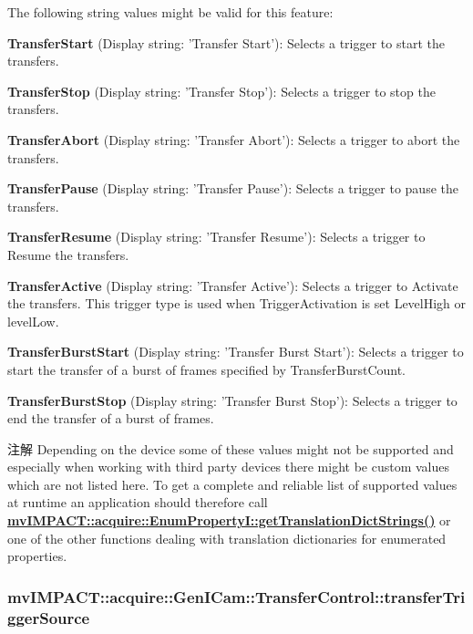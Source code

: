 The following string values might be valid for this feature\+:
\begin{DoxyItemize}
\item {\bfseries Transfer\+Start} (Display string\+: 'Transfer Start')\+: Selects a trigger to start the transfers.
\item {\bfseries Transfer\+Stop} (Display string\+: 'Transfer Stop')\+: Selects a trigger to stop the transfers.
\item {\bfseries Transfer\+Abort} (Display string\+: 'Transfer Abort')\+: Selects a trigger to abort the transfers.
\item {\bfseries Transfer\+Pause} (Display string\+: 'Transfer Pause')\+: Selects a trigger to pause the transfers.
\item {\bfseries Transfer\+Resume} (Display string\+: 'Transfer Resume')\+: Selects a trigger to Resume the transfers.
\item {\bfseries Transfer\+Active} (Display string\+: 'Transfer Active')\+: Selects a trigger to Activate the transfers. This trigger type is used when Trigger\+Activation is set Level\+High or level\+Low.
\item {\bfseries Transfer\+Burst\+Start} (Display string\+: 'Transfer Burst Start')\+: Selects a trigger to start the transfer of a burst of frames specified by Transfer\+Burst\+Count.
\item {\bfseries Transfer\+Burst\+Stop} (Display string\+: 'Transfer Burst Stop')\+: Selects a trigger to end the transfer of a burst of frames.
\end{DoxyItemize}

\begin{DoxyNote}{注解}
Depending on the device some of these values might not be supported and especially when working with third party devices there might be custom values which are not listed here. To get a complete and reliable list of supported values at runtime an application should therefore call {\bfseries \hyperlink{classmv_i_m_p_a_c_t_1_1acquire_1_1_enum_property_i_a0ba6ccbf5ee69784d5d0b537924d26b6}{mv\+I\+M\+P\+A\+C\+T\+::acquire\+::\+Enum\+Property\+I\+::get\+Translation\+Dict\+Strings()}} or one of the other functions dealing with translation dictionaries for enumerated properties. 
\end{DoxyNote}
\hypertarget{classmv_i_m_p_a_c_t_1_1acquire_1_1_gen_i_cam_1_1_transfer_control_a9317af45736dd72396ed0ac87129201d}{
\subsubsection[{transfer\+Trigger\+Source}]{ mv\+I\+M\+P\+A\+C\+T\+::acquire\+::\+Gen\+I\+Cam\+::\+Transfer\+Control\+::transfer\+Trigger\+Source}}\label{classmv_i_m_p_a_c_t_1_1acquire_1_1_gen_i_cam_1_1_transfer_control_a9317af45736dd72396ed0ac87129201d}


